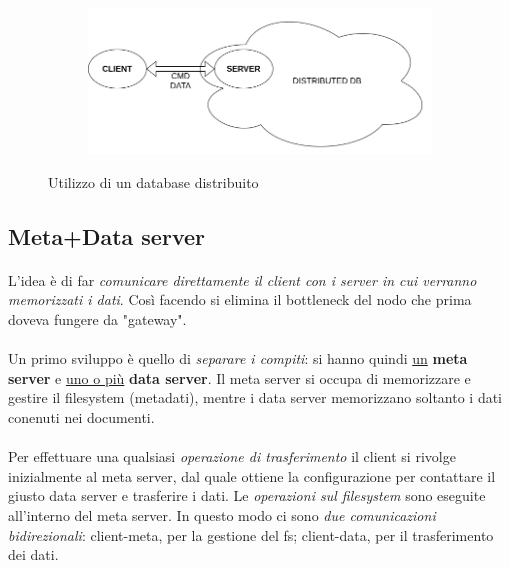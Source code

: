 \documentclass[11pt,a4paper,english]{article}
\begin{document}
\begin{figure}[H]
	\centering
	\begin{subfigure}{0.80\linewidth}
		\includegraphics[width=\linewidth]{../diagrams/architettura/4.png}
	\end{subfigure}
	\caption{Utilizzo di un database distribuito}
\end{figure}



\subsection{Meta+Data server}

\paragraph{} L'idea è di far \emph{comunicare direttamente il client con i server in cui verranno memorizzati i dati}. Così facendo si elimina il bottleneck del nodo che prima doveva fungere da "gateway". 

\paragraph{} Un primo sviluppo è quello di \emph{separare i compiti}: si hanno quindi \underline{un} \textbf{meta server} e \underline{uno o più} \textbf{data server}. Il meta server si occupa di memorizzare e gestire il filesystem (metadati), mentre i data server memorizzano soltanto i dati conenuti nei documenti. 

\paragraph{} Per effettuare una qualsiasi \emph{operazione di trasferimento} il client si rivolge inizialmente al meta server, dal quale ottiene la configurazione per contattare il giusto data server e trasferire i dati. Le \emph{operazioni sul filesystem} sono eseguite all'interno del meta server. In questo modo ci sono \emph{due comunicazioni bidirezionali}: client-meta, per la gestione del fs; client-data, per il trasferimento dei dati.
\end{document}
